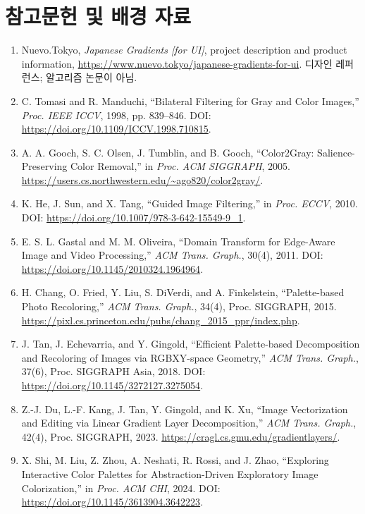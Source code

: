 \documentclass[10pt]{article}
\begin{document}
\section*{참고문헌 및 배경 자료}
\begin{enumerate}[leftmargin=1.5em,itemsep=2pt]
\item Nuevo.Tokyo, \emph{Japanese Gradients [for UI]}, project description and product information, \url{https://www.nuevo.tokyo/japanese-gradients-for-ui}. 디자인 레퍼런스; 알고리즘 논문이 아님.
\item C. Tomasi and R. Manduchi, ``Bilateral Filtering for Gray and Color Images,'' \emph{Proc. IEEE ICCV}, 1998, pp. 839--846. DOI: \url{https://doi.org/10.1109/ICCV.1998.710815}.
\item A. A. Gooch, S. C. Olsen, J. Tumblin, and B. Gooch, ``Color2Gray: Salience-Preserving Color Removal,'' in \emph{Proc. ACM SIGGRAPH}, 2005. \url{https://users.cs.northwestern.edu/~ago820/color2gray/}.
\item K. He, J. Sun, and X. Tang, ``Guided Image Filtering,'' in \emph{Proc. ECCV}, 2010. DOI: \url{https://doi.org/10.1007/978-3-642-15549-9_1}.
\item E. S. L. Gastal and M. M. Oliveira, ``Domain Transform for Edge-Aware Image and Video Processing,'' \emph{ACM Trans. Graph.}, 30(4), 2011. DOI: \url{https://doi.org/10.1145/2010324.1964964}.
\item H. Chang, O. Fried, Y. Liu, S. DiVerdi, and A. Finkelstein, ``Palette-based Photo Recoloring,'' \emph{ACM Trans. Graph.}, 34(4), Proc. SIGGRAPH, 2015. \url{https://pixl.cs.princeton.edu/pubs/chang_2015_ppr/index.php}.
\item J. Tan, J. Echevarria, and Y. Gingold, ``Efficient Palette-based Decomposition and Recoloring of Images via RGBXY-space Geometry,'' \emph{ACM Trans. Graph.}, 37(6), Proc. SIGGRAPH Asia, 2018. DOI: \url{https://doi.org/10.1145/3272127.3275054}.
\item Z.-J. Du, L.-F. Kang, J. Tan, Y. Gingold, and K. Xu, ``Image Vectorization and Editing via Linear Gradient Layer Decomposition,'' \emph{ACM Trans. Graph.}, 42(4), Proc. SIGGRAPH, 2023. \url{https://cragl.cs.gmu.edu/gradientlayers/}.
\item X. Shi, M. Liu, Z. Zhou, A. Neshati, R. Rossi, and J. Zhao, ``Exploring Interactive Color Palettes for Abstraction-Driven Exploratory Image Colorization,'' in \emph{Proc. ACM CHI}, 2024. DOI: \url{https://doi.org/10.1145/3613904.3642223}.
\end{enumerate}
\end{document}
